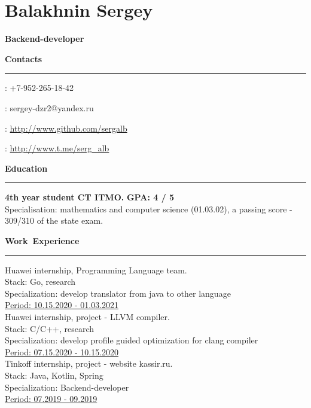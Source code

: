 \documentclass[10pt, a4paper]{report}
\author{Balakhnin Sergey}
\begin{document}
    \section*{Balakhnin Sergey}

    {\large\textbf{Backend-developer}}

    \hbox{\large\textbf{Contacts}}\kern5pt\hrule\kern5pt

    \faPhone: +7-952-265-18-42

    \Letter: sergey-dzr2@yandex.ru

    \faGithub: \url{http://www.github.com/sergalb}

    \faSend: \url{http://www.t.me/serg_alb}\\



    \par\hbox{\large\textbf{Education}}\kern5pt\hrule\kern5pt

    \textbf{4th year student CT ITMO.}
    \hfill
    \textbf{ GPA: 4 / 5} \\
        Specialisation: mathematics and computer science (01.03.02), a passing score - 309/310 of the state exam.\\

    \par\hbox{\large\textbf{Work Experience}}\kern3pt\hrule\kern10pt

    Huawei internship, Programming Language team. \\
    Stack: Go, research \\
    Specialization: develop translator from java to other language \\
    \underline{Period: 10.15.2020 - 01.03.2021} \\

    Huawei internship, project - LLVM compiler. \\
    Stack: C/C++, research \\
    Specialization: develop profile guided optimization for clang compiler\\
    \underline{Period: 07.15.2020 - 10.15.2020} \\

    Tinkoff internship, project - website kassir.ru. \\
    Stack: Java, Kotlin, Spring \\
    Specialization: Backend-developer \\
    \underline{Period: 07.2019 - 09.2019} \\
\end{document}
